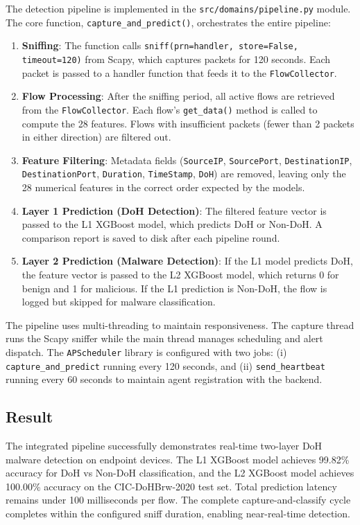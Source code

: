 \documentclass[../Main.tex]{subfiles}
\begin{document}
The detection pipeline is implemented in the \texttt{src/domains/pipeline.py} module. The core function, \texttt{capture\_and\_predict()}, orchestrates the entire pipeline:

\begin{enumerate}
    \item \textbf{Sniffing}: The function calls \texttt{sniff(prn=handler, store=False, timeout=120)} from Scapy, which captures packets for 120 seconds. Each packet is passed to a handler function that feeds it to the \texttt{FlowCollector}.
    \item \textbf{Flow Processing}: After the sniffing period, all active flows are retrieved from the \texttt{FlowCollector}. Each flow's \texttt{get\_data()} method is called to compute the 28 features. Flows with insufficient packets (fewer than 2 packets in either direction) are filtered out.
    \item \textbf{Feature Filtering}: Metadata fields (\texttt{SourceIP}, \texttt{SourcePort}, \texttt{DestinationIP}, \texttt{DestinationPort}, \texttt{Duration}, \texttt{TimeStamp}, \texttt{DoH}) are removed, leaving only the 28 numerical features in the correct order expected by the models.
    \item \textbf{Layer 1 Prediction (DoH Detection)}: The filtered feature vector is passed to the L1 XGBoost model, which predicts DoH or Non-DoH. A comparison report is saved to disk after each pipeline round.
    \item \textbf{Layer 2 Prediction (Malware Detection)}: If the L1 model predicts DoH, the feature vector is passed to the L2 XGBoost model, which returns 0 for benign and 1 for malicious. If the L1 prediction is Non-DoH, the flow is logged but skipped for malware classification.
\end{enumerate}

The pipeline uses multi-threading to maintain responsiveness. The capture thread runs the Scapy sniffer while the main thread manages scheduling and alert dispatch. The \texttt{APScheduler} library is configured with two jobs: (i) \texttt{capture\_and\_predict} running every 120 seconds, and (ii) \texttt{send\_heartbeat} running every 60 seconds to maintain agent registration with the backend.

\subsection{Result}

The integrated pipeline successfully demonstrates real-time two-layer DoH malware detection on endpoint devices. The L1 XGBoost model achieves 99.82\% accuracy for DoH vs Non-DoH classification, and the L2 XGBoost model achieves 100.00\% accuracy on the CIC-DoHBrw-2020 test set. Total prediction latency remains under 100 milliseconds per flow. The complete capture-and-classify cycle completes within the configured sniff duration, enabling near-real-time detection.
\end{document}
